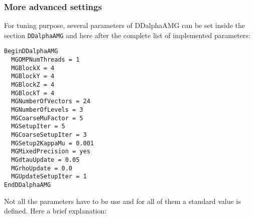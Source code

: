 \subsubsection{More advanced settings}
For tuning purpose, several parameters of DDalphaAMG can be set inside the section \texttt{DDalphaAMG} and here after the complete list of implemented parameters: 
\begin{Verbatim}[fontsize=\small]
BeginDDalphaAMG
  MGOMPNumThreads = 1
  MGBlockX = 4
  MGBlockY = 4
  MGBlockZ = 4
  MGBlockT = 4
  MGNumberOfVectors = 24
  MGNumberOfLevels = 3
  MGCoarseMuFactor = 5
  MGSetupIter = 5
  MGCoarseSetupIter = 3
  MGSetup2KappaMu = 0.001
  MGMixedPrecision = yes
  MGdtauUpdate = 0.05
  MGrhoUpdate = 0.0
  MGUpdateSetupIter = 1
EndDDalphaAMG
\end{Verbatim}
Not all the parameters have to be use and for all of them a standard value is defined. Here a brief explanation:
